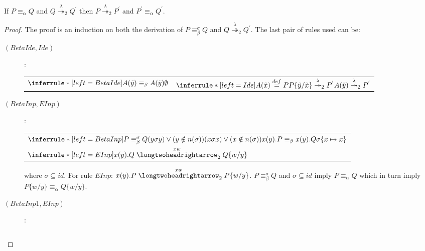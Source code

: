 \begin{lemma}
  If $P\equiv_{\alpha} Q$ and $Q\stackrel{\lambda}{\twoheadrightarrow}_{2} Q^{'}$ then $P\stackrel{\lambda}{\twoheadrightarrow}_{2} P^{'}$ and $P^{'}\equiv_{\alpha} Q^{'}$.
  \begin{proof}
    The proof is an induction on both the derivation of $P\equiv_{\beta}^{\sigma} Q$ and $Q\stackrel{\lambda}{\twoheadrightarrow}_{2} Q^{'}$. The last pair of rules used can be:
    \begin{description}
      \item[$(BetaIde, Ide)$]:
	\begin{center}
	  \begin{tabular}{ll}
	      $\inferrule*[left=BetaIde]{
	      }{
		  A(\tilde{y})\equiv_{\beta}A(\tilde{y})
		\\
		  \emptyset
	      }$	      
	    &
	      $\inferrule*[left=Ide]{
		  A(\tilde{x}) \stackrel{def}{=} P
		\\
		  P\{\tilde{y}/\tilde{x}\} \stackrel{\lambda}{\twoheadrightarrow}_{2} P^{'}
	      }{
		  A(\tilde{y}) \stackrel{\lambda}{\twoheadrightarrow}_{2} P^{'}
	      }$	      
	  \\
	  \end{tabular}
	\end{center}
      \item[$(BetaInp, EInp)$]:
	\begin{center}
	  \begin{tabular}{l}
	      $\inferrule*[left=BetaInp]{
		  P\equiv_{\beta}^{\sigma}Q
		\\
		  (y \sigma y) \vee (y\notin n(\sigma))
		\\
		  (x \sigma x) \vee (x\notin n(\sigma))
	      }{
		  x(y).P\equiv_{\beta}x(y).Q
		\\
		  \sigma \{x\mapsto x\}
	      }$
	    \\
	      $\inferrule*[left=EInp]{
	      }{
		  x(y).Q \stackrel{xw}{\longtwoheadrightarrow}_{2} Q\{w/y\}
	      }$	      
	  \\
	  \end{tabular}
	\end{center}
	where $\sigma \subseteq id$. For rule $EInp$: $x(y).P \stackrel{xw}{\longtwoheadrightarrow}_{2} P\{w/y\}$. $P\equiv_{\beta}^{\sigma}Q$ and $\sigma\subseteq id$ imply $P\equiv_{\alpha}Q$ which in turn imply $P\{w/y\} \equiv_{\alpha} Q\{w/y\}$.
      \item[$(BetaInp1, EInp)$]:
	\begin{center}
	  \begin{tabular}{l}

\end{tabular}
\end{center}
\end{description}
\end{proof}
\end{lemma}
